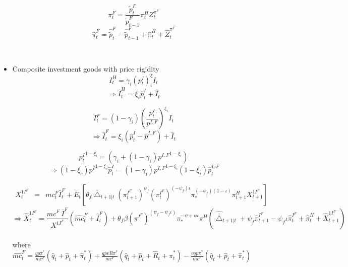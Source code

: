 \documentclass[11pt, a4paper]{article}
\begin{document}
\begin{itemize}
\[ \pi_t^F = \frac{\tilde{p}_t^{F}} {\tilde{p}_{t-1}^{F}} \pi_t^H Z_t^{\pi^F}\]
\begin{equation}
\widehat{\pi}_t^F = \widehat{\tilde{p}}_t^{F} -\widehat{\tilde{p}}_{t-1}^{F} + \widehat{\pi}_t^H + \widehat{Z}_t^{\pi^F}
\end{equation}
\par
~\\

\item Composite investment goods with price rigidity
\[I_t^H = \gamma_i {\left(p_t^I \right)}^\xi_i I_t\]
 \begin{equation}
 \Rightarrow \widehat{I}_t^H = \xi_i \widehat{p}_t^I + \widehat{I}_t
 \end{equation}
 
  \[I_t^F = (1-\gamma_i) \left(\frac{p_t^I}{p^{I,F}}\right)^{\xi_{i}} I_t  \]
 \begin{equation}
 \Rightarrow \widehat{I}_t^F = \xi_i (\widehat{p}_t^I -\widehat{p}^{I,F}) + \widehat{I}_t
 \end{equation}
 
 \[{p_t^I}^{1-\xi_i} = \left(\gamma_i + (1-\gamma_i){p^{I,F}}^{1-\xi_i}\right) \]
 \begin{equation}
 \Rightarrow (1-\xi_c){{p^I}^{1-\xi_c}} \widehat{p}_t^I = (1-\gamma_i){p^{I,F}}^{1-\xi_i} (1-\xi_i)\widehat{p}_t^{I,F}
 \end{equation}

\begin{eqnarray*} X_{t}^{1I^F} &=&  mc_t^F \bar{I}_t^F + E_t \left[\theta_f \bar{\bigtriangleup}_{t+1|t}  {(\pi_{t+1}^{I^F})}^{\psi_f} {(\pi_t^{I^F})}^{(-\psi_f)\iota} \pi_*^{{(-\psi_f)}(1-\iota) } \pi_{t+1}^H X_{t+1}^{1I^F} \right] \end{eqnarray*} 
\begin{equation}\Rightarrow  \widehat{X}_t^{1I^F} = \frac{ mc^F~ \bar{I}^F} {X^{1I^F}} (\widehat{mc}_t^F + \widehat{I}_t^F) + \theta_f \beta {(\pi^{I^F})}^{(\psi_f - \psi_f\iota)} \pi_*^{-\psi + \psi\iota} \pi^H \left(\widehat{\bar{\bigtriangleup}}_{t+1|t} + \psi_f\widehat{{\pi}}_{t+1}^{I^F}-\psi_f\iota \widehat{\pi}_t^{I^F} + \widehat{\pi}_t^H + \widehat{X}_{t+1}^{1I^F} \right)\end{equation}
\\
where  $\widehat{mc}_t^F = \frac{qp\pi^*}{mc^F}{(\widehat{q}_t + \widehat{p}_t + \widehat{\pi}_t^*) +\frac{qpvR\pi^*}{mc^F} (\widehat{q}_t + \widehat{p}_t + \widehat{R}_t + \widehat{\pi}_t^*) - \frac{vqp\pi^*}{mc^F}(\widehat{q}_t + \widehat{p}_t + \widehat{\pi}_t^*)}$ 


\end{itemize}
\end{document}
